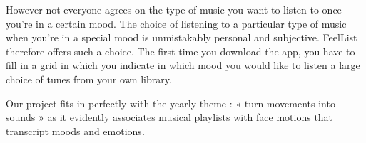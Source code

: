 	However not everyone agrees on the type of music you want to listen to once you’re in a certain mood.
	The choice of listening to a particular type of music when you’re in a special mood is unmistakably personal and subjective.
	FeelList therefore offers such a choice.
	The first time you download the app, you have to fill in a grid in which you indicate in which mood you would like to listen a large choice of tunes from your own library.

	Our project fits in perfectly with the yearly theme : « turn movements into sounds » as it evidently associates musical playlists with face motions that transcript moods and emotions.